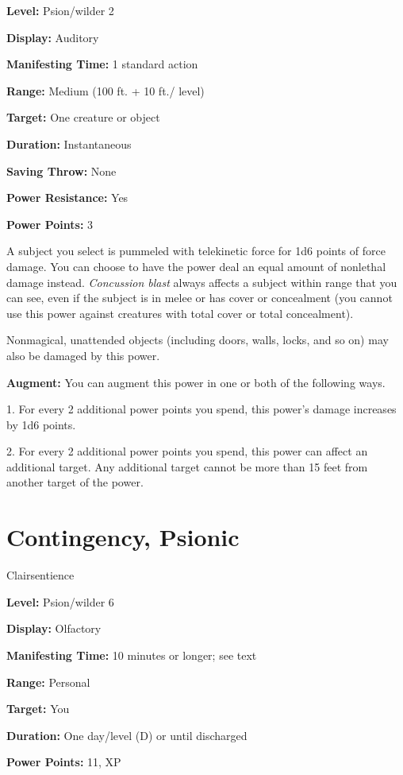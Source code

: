 \documentclass{article}
\begin{document}
\textbf{Level:} Psion/wilder 2

\textbf{Display:} Auditory

\textbf{Manifesting Time:} 1 standard action

\textbf{Range:} Medium (100 ft. + 10 ft./ level)

\textbf{Target:} One creature or object

\textbf{Duration:} Instantaneous

\textbf{Saving Throw:} None

\textbf{Power Resistance:} Yes

\textbf{Power Points:} 3

A subject you select is pummeled with telekinetic force for 1d6 points of force 
damage. You can choose to have the power deal an equal amount of nonlethal damage 
instead. \textit{Concussion blast }always affects a subject within range that you 
can see, even if the subject is in melee or has cover or concealment (you cannot 
use this power against creatures with total cover or total concealment).

Nonmagical, unattended objects (including doors, walls, locks, and so on) may also 
be damaged by this power.

\textbf{Augment:} You can augment this power in one or both of the following ways.

1. For every 2 additional power points you spend, this power's damage increases 
by 1d6 points.

2. For every 2 additional power points you spend, this power can affect an additional 
target. Any additional target cannot be more than 15 feet from another target of 
the power.

\vspace{12pt}
\section*{Contingency, Psionic}

Clairsentience

\textbf{Level:} Psion/wilder 6

\textbf{Display:} Olfactory

\textbf{Manifesting Time:} 10 minutes or longer; see text

\textbf{Range:} Personal

\textbf{Target:} You

\textbf{Duration:} One day/level (D) or until discharged

\textbf{Power Points:} 11, XP
\end{document}
